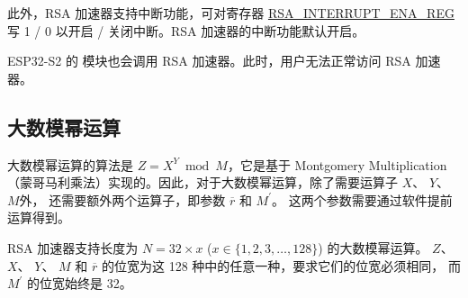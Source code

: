 \documentclass[main\_\_CN.tex]{subfiles}
\begin{document}
此外，RSA 加速器支持中断功能，可对寄存器 \hyperref[regdesc:RSAINTERRUPTENAREG]{RSA\_INTERRUPT\_ENA\_REG} 写 1 / 0 以开启 / 关闭中断。RSA 加速器的中断功能默认开启。

\begin{importantlisting}
\vspace{-0.5em}

    ESP32-S2 的  模块也会调用 RSA 加速器。此时，用户无法正常访问 RSA 加速器。
\end{importantlisting}

\subsection{大数模幂运算}\label{subsection:large_modular_Exponentiation}

大数模幂运算的算法是 \begin{math}Z = X^{Y} \bmod M\end{math}，它是基于 Montgomery Multiplication （蒙哥马利乘法）实现的。因此，对于大数模幂运算，除了需要运算子
\begin{math}X\end{math}、
\begin{math}Y\end{math}、
\begin{math}M\end{math}外，
还需要额外两个运算子，即参数
\begin{math}\overline{r}\end{math} 和
\begin{math}M^{\prime}\end{math}。
这两个参数需要通过软件提前运算得到。

RSA 加速器支持长度为
\begin{math}N = 32 \times x\end{math} (\begin{math}x \in \{ 1,2,3, \dots, 128\} \end{math}) 的大数模幂运算。
\begin{math}Z\end{math}、
\begin{math}X\end{math}、
\begin{math}Y\end{math}、
\begin{math}M\end{math} 和
\begin{math}\overline{r}\end{math}
的位宽为这 128 种中的任意一种，要求它们的位宽必须相同，
而 \begin{math}M^{\prime}\end{math} 的位宽始终是 32。
\end{document}

